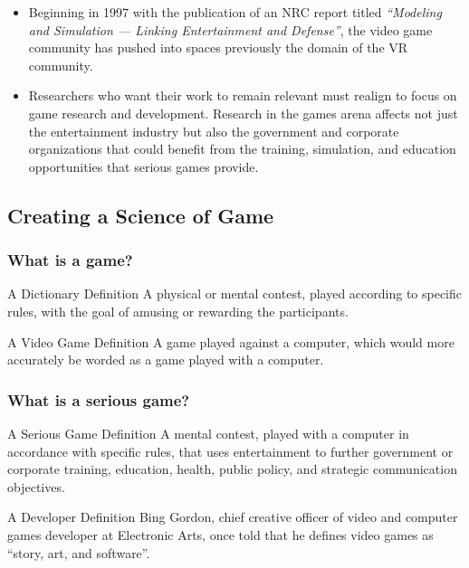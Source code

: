 \begin{frame}
\begin{itemize}[<+->]
\item
Beginning in 1997 with the publication of an NRC report titled \emph{``Modeling
and Simulation --- Linking Entertainment and Defense''}, the video game
community has pushed into spaces previously the domain of the VR community.
\item
Researchers who want their work to remain relevant must realign to focus on
game research and development. Research in the games arena affects not just
the entertainment industry but also the government and corporate organizations
that could benefit from the training, simulation, and education opportunities
that serious games provide.
\end{itemize}
\end{frame}

\subsection{Creating a Science of Game}

\begin{frame}
\frametitle{What is a game?}
\begin{block}{A Dictionary Definition}
A physical or mental contest, played according to specific rules,
with the goal of amusing or rewarding the participants.
\end{block}
\pause
\begin{block}{A Video Game Definition}
A game played \alert{against a computer}, which would more
accurately be worded as a game played \alert{with a computer}.
\end{block}
\end{frame}

\begin{frame}
\frametitle{What is a serious game?}
\begin{block}{A Serious Game Definition}
A mental contest, played with a computer in accordance with
specific rules, \alert{that uses entertainment to} further government or
corporate training, education, health, public policy, and strategic
communication objectives.
\end{block}
\pause
\begin{block}{A Developer Definition}
Bing Gordon, chief creative officer of video and
computer games developer at Electronic Arts, once
told that he defines video games as \alert{``story, art,
and software''}.
\end{block}
\end{frame}

